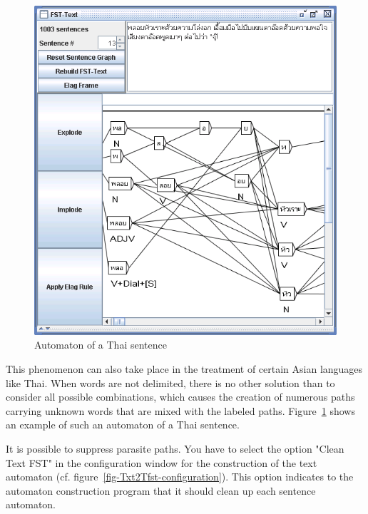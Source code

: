 \begin{figure}[!ht]
\begin{center}
\includegraphics[width=14cm]{resources/img/fig7-9.png}
\caption{Automaton of a Thai
sentence\label{fig-thai-sentence-automaton}}
\end{center}
\end{figure}

\bigskip
\noindent This phenomenon can also take place in the treatment of certain Asian languages
like Thai. When words are not delimited, there is no other solution than to
consider all possible combinations, which causes the creation of numerous paths
carrying unknown words that are mixed with the labeled paths.
Figure~\ref{fig-thai-sentence-automaton} shows an example of such an automaton of a
Thai sentence.

\bigskip
\noindent It is possible to suppress parasite paths. You have to select the option "Clean
Text FST" in the configuration window for the construction of the text automaton
(cf. figure~\ref{fig-Txt2Tfst-configuration}).
This option indicates to the automaton construction program that it should clean
up each sentence automaton.

